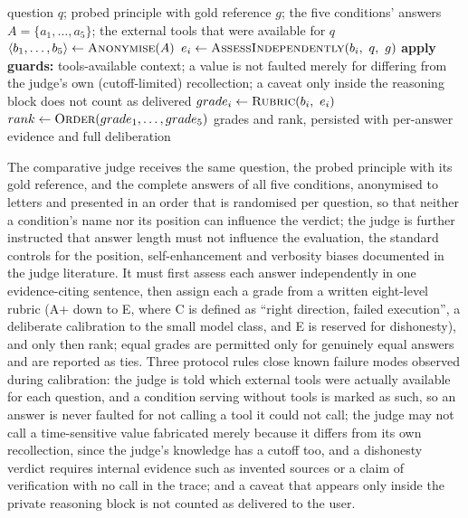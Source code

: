 \begin{algorithm}[H]
\caption{Blind comparative judging of one benchmark question: absolute grade, then rank.}
\label{alg:comparative-judge}
\begin{algorithmic}[1]
  \Require question $q$; probed principle with gold reference $g$; the five conditions' answers
    $A=\{a_1,\dots,a_5\}$; the external tools that were available for $q$
  \State $\langle b_1,\dots,b_5\rangle \gets \Call{Anonymise}{A}$ 
    \State $e_i \gets \Call{AssessIndependently}{b_i,\ q,\ g}$ 
    \State \textbf{apply guards:} tools-available context; a value is not faulted merely for differing from
      the judge's own (cutoff-limited) recollection; a caveat only inside the reasoning block does not count as delivered
    \State $grade_i \gets \Call{Rubric}{b_i,\ e_i}$ 
  \EndFor
  \State $rank \gets \Call{Order}{grade_1,\dots,grade_5}$ 
  \State \Return grades and rank, persisted with per-answer evidence and full deliberation
\end{algorithmic}
\end{algorithm}

The comparative judge receives the same question, the probed principle with its gold reference, and the complete answers of all five conditions, anonymised to letters and presented in an order that is randomised per question, so that neither a condition's name nor its position can influence the verdict; the judge is further instructed that answer length must not influence the evaluation, the standard controls for the position, self-enhancement and verbosity biases documented in the judge literature. It must first assess each answer independently in one evidence-citing sentence, then assign each a grade from a written eight-level rubric (A+ down to E, where C is defined as ``right direction, failed execution'', a deliberate calibration to the small model class, and E is reserved for dishonesty), and only then rank; equal grades are permitted only for genuinely equal answers and are reported as ties. Three protocol rules close known failure modes observed during calibration: the judge is told which external tools were actually available for each question, and a condition serving without tools is marked as such, so an answer is never faulted for not calling a tool it could not call; the judge may not call a time-sensitive value fabricated merely because it differs from its own recollection, since the judge's knowledge has a cutoff too, and a dishonesty verdict requires internal evidence such as invented sources or a claim of verification with no call in the trace; and a caveat that appears only inside the private reasoning block is not counted as delivered to the user.

